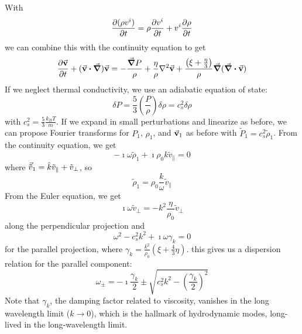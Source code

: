 \documentclass[a4paper,twoside,master.tex]{subfiles}
\begin{document}
With
\begin{equation}
    \pdv{(\rho v^i)}{t} = \rho \pdv{v^i}{t} + v^i \pdv{\rho}{t}
\end{equation}
we can combine this with the continuity equation to get
\begin{equation}
    \pdv{\va{v}}{t} + (\va{v} \vdot \grad) \va{v} = - \frac{\grad{P}}{\rho} + \frac{\eta}{\rho} \laplacian{\va{v}} + \frac{\left( \xi + \frac{\eta}{3} \right)}{\rho} \grad{(\div{\va{v}})}
\end{equation}
If we neglect thermal conductivity, we use an adiabatic equation of state:
\begin{equation}
    \delta P = \frac{5}{3} \left( \frac{P}{\rho} \right) \delta \rho = c_s^2 \delta \rho
\end{equation}
with $ c_s^2 = \frac{5}{3} \frac{k_B T}{m} $. If we expand in small perturbations and linearize as before, we can propose Fourier transforms for $ P_1 $, $ \rho_1 $, and $ \va{v}_1 $ as before with $ \tilde{P}_1 = c_s^2 \tilde{\rho}_1 $. From the continuity equation, we get
\begin{equation}
    - \imath \omega \tilde{\rho}_1 + \imath \rho_0 k \tilde{v}_{\parallel} = 0
\end{equation}
where $ \va{\tilde{v}}_1 = \hat{k} \tilde{v}_{\parallel} + \tilde{v}_{\perp} $, so
\begin{equation}
    \tilde{\rho}_1 = \rho_0 \frac{k}{\omega} \tilde{v}_{\parallel}
\end{equation}
From the Euler equation, we get
\begin{equation}
    \imath \omega \tilde{v}_{\perp} = - k^2 \frac{\eta}{\rho_0} \tilde{v}_{\perp}
\end{equation}
along the perpendicular projection and
\begin{equation}
    \omega^2 - c_s^2 k^2 + \imath \omega \gamma_k = 0
\end{equation}
for the parallel projection, where $ \gamma_k = \frac{k^2}{\rho_0} \left( \xi + \frac{4}{3} \eta \right) $. this gives us a dispersion relation for the parallel component:
\begin{equation}
    \omega_{\pm} = - \imath \frac{\gamma_k}{2} \pm \sqrt{c_s^2 k^2 - \left( \frac{\gamma_k}{2} \right)^2}
\end{equation}
Note that $\gamma_k$, the damping factor related to viscosity, vanishes in the long wavelength limit ($ k \to 0 $), which is the hallmark of hydrodynamic modes, long-lived in the long-wavelength limit.
\end{document}
